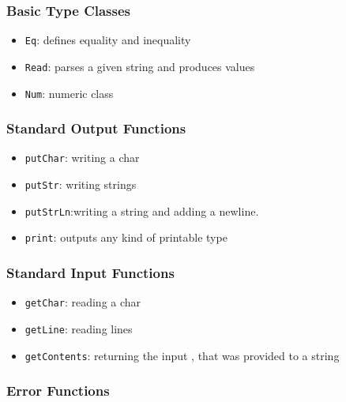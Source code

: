 \documentclass[a4paper, titlepage, twoside]{article}
\begin{document}
\subsubsection{Basic Type Classes}
\label{sec:org6eaaaa9}

\begin{itemize}
\item \texttt{Eq}: defines equality and inequality

\item \texttt{Read}: parses a given string and produces values

\item \texttt{Num}: numeric class
\end{itemize}

\subsubsection{Standard Output Functions}
\label{sec:orgd5e0806}

\begin{itemize}
\item \texttt{putChar}: writing a char

\item \texttt{putStr}: writing strings

\item \texttt{putStrLn}:writing a string and adding a newline.

\item \texttt{print}: outputs any kind of printable type
\end{itemize}

\subsubsection{Standard Input Functions}
\label{sec:org5f817e8}

\begin{itemize}
\item \texttt{getChar}: reading a char

\item \texttt{getLine}: reading lines

\item \texttt{getContents}: returning the input , that was provided to a string
\end{itemize}

\subsubsection{Error Functions}
\label{sec:orgaa5c3a3}
\end{document}
